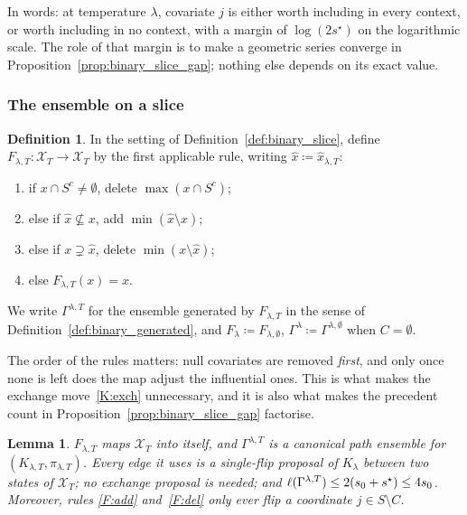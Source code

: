\documentclass[aos]{imsart}%
\newcommand{\ambientspace}[0]{\mathcal{X}}
\theoremstyle{plain}
\newtheorem{lemma}[theorem]{Lemma}
\theoremstyle{definition}
\newtheorem{definition}[theorem]{Definition}
\begin{document}
    In words: at temperature $\lambda$, covariate $j$ is either worth including
    in every context, or worth including in no context, with a margin of
    $\log(2s^{\star})$ on the logarithmic scale. The role of that margin is to
    make a geometric series converge in
    Proposition~\ref{prop:binary_slice_gap}; nothing else depends on its exact
    value.

    \subsubsection{The ensemble on a slice}

    \begin{definition}
        \label{def:binary_ensemble}
        In the setting of Definition~\ref{def:binary_slice}, define
        $F_{\lambda,T}:\ambientspace_T\to\ambientspace_T$ by the first
        applicable rule, writing $\hat x\coloneq\hat x_{\lambda,T}$:
        \begin{enumerate}[label=(\alph*),leftmargin=3.2em,noitemsep]
            \item\label{F:null} if $x\cap S^{c}\neq\emptyset$, delete
            $\max(x\cap S^{c})$;
            \item\label{F:add} else if $\hat x\not\subseteq x$, add
            $\min(\hat x\setminus x)$;
            \item\label{F:del} else if $x\supsetneq\hat x$, delete
            $\min(x\setminus\hat x)$;
            \item\label{F:fix} else $F_{\lambda,T}(x)=x$.
        \end{enumerate}
        We write $\Gamma^{\lambda,T}$ for the ensemble generated by
        $F_{\lambda,T}$ in the sense of
        Definition~\ref{def:binary_generated}, and
        $F_\lambda\coloneq F_{\lambda,\emptyset}$,
        $\Gamma^{\lambda}\coloneq\Gamma^{\lambda,\emptyset}$ when
        $C=\emptyset$.
    \end{definition}

    The order of the rules matters: null covariates are removed \emph{first},
    and only once none is left does the map adjust the influential ones. This
    is what makes the exchange move~\ref{K:exch} unnecessary, and it is also
    what makes the precedent count in
    Proposition~\ref{prop:binary_slice_gap} factorise.

    \begin{lemma}
        \label{lemma:binary_ensemble_valid}
        $F_{\lambda,T}$ maps $\ambientspace_T$ into itself, and
        $\Gamma^{\lambda,T}$ is a canonical path ensemble for
        $(K_{\lambda,T},\pi_{\lambda,T})$. Every edge it uses is a single-flip
        proposal of $K_\lambda$ between two states of $\ambientspace_T$; no
        exchange proposal is needed; and
        $\ell(\Gamma^{\lambda,T})\leq2(s_0+s^{\star})\leq4s_0$. Moreover, rules
        \ref{F:add} and~\ref{F:del} only ever flip a coordinate
        $j\in S\setminus C$.
    \end{lemma}
\end{document}
